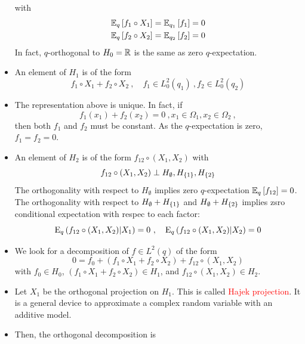 \documentclass[xcolor=svgnames]{beamer}
\newcommand{\rosso}[1]{\textcolor{red}{#1}}
\renewcommand{\emph}{\rosso}
\begin{document}
\begin{frame}
\begin{itemize}
    with 
    \begin{gather*}
        \operatorname{\mathbb E}_{q}\left[f_1\circ X_1\right] = \operatorname{\mathbb E}_{q_1}\left[f_1\right] = 0 \\
           \operatorname{\mathbb E}_{q}\left[f_2\circ X_2\right] = \operatorname{\mathbb E}_{q_2}\left[f_2\right] = 0 
    \end{gather*}
   In fact, $q$-orthogonal to $H_0 = \mathbb{R}$ is the same as zero $q$-expectation.
   \item An element of $H_1$ is of the form
   \begin{equation*}
       f_1\circ X_1 + f_2 \circ X_2 \ , \quad f_1 \in L^2_0(q_1) \ , f_2 \in L^2_0(q_2)
   \end{equation*}
   \item The representation above is unique. In fact, if
   \begin{equation*}
       f_1(x_1) + f_2(x_2) = 0 \ , x_1 \in \Omega_1, x_2 \in \Omega_2 \ ,
   \end{equation*}
   then both $f_1$ and $f_2$ must be constant. As the $q$-expectation is zero, $f_1 = f_2 = 0$.
   \item An element of $H_2$ is of the form $f_{12} \circ(X_1,X_2)$ with
   \begin{equation*}
     f_{12} \circ(X_1,X_2) \perp H_{\emptyset}, H_{\left\{1\right\}}, H_{\left\{2\right\}}  
   \end{equation*}
   The orthogonality with respect to $H_{\emptyset}$ implies zero $q$-expectation $\operatorname{\mathbb E}_{q}\left[f_{12}\right] = 0$. The orthogonality with respect to $H_{\emptyset} + H_{\left\{1\right\}}$ and $H_{\emptyset} + H_{\left\{2\right\}}$ implies zsro conditional expectation with respec to each factor:
   \begin{equation*}
       \operatorname{E}_{q}\left(f_{12} \circ (X_1,X_2) \middle| X_1\right) = 0 \ , \quad \operatorname{E}_{q}\left(f_{12} \circ (X_1,X_2) \middle| X_2\right) = 0
   \end{equation*}
    \item We look for a decomposition of $f \in L^2(q)$ of the form
    \begin{equation*}
    0 = f_0 + (f_1\circ X_1 + f_2\circ X_2) + f_{12}\circ (X_1,X_2)
    \end{equation*}
    with $f_0 \in H_0$, $(f_1\circ X_1 + f_2\circ X_2) \in H_1$, and $f_{12}\circ (X_1,X_2) \in H_2$. 
    \item Let $X_1$ be the orthogonal projection on $H_1$. This is called \emph{Hajek projection}. It is a general device to approximate a complex random variable with an additive model. 
    \item Then, the orthogonal decomposition is 
    \begin{equation*}

\end{equation*}
\end{itemize}
\end{frame}
\end{document}
